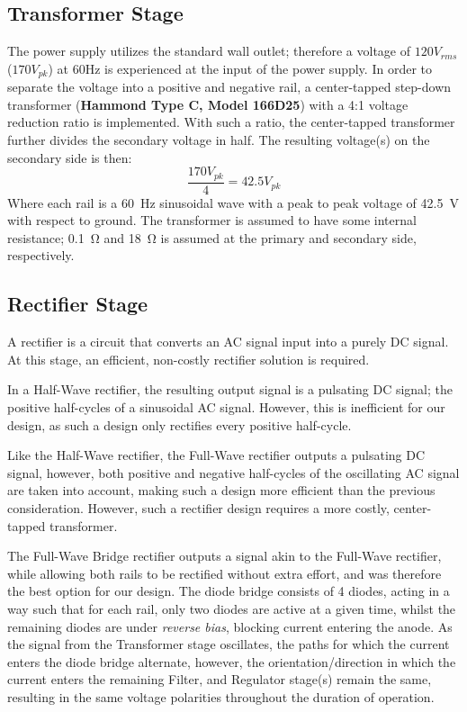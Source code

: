 \documentclass[12pt]{article}
\begin{document}
\subsection{Transformer Stage}
The power supply utilizes the standard wall outlet; therefore a voltage of $120V_{rms}$ ($170V_{pk}$) at 60Hz is experienced at the input of the power supply. In order to separate the voltage into a positive and negative rail, a center-tapped step-down transformer (\textbf{Hammond Type C, Model 166D25}) with a 4:1 voltage reduction ratio is implemented. With such a ratio, the center-tapped transformer further divides the secondary voltage in half. The resulting voltage(s) on the secondary side is then: 
\[ \frac{170V_{pk}}{4} = 42.5V_{pk}\]
Where each rail is a \SI{60}{\hertz} sinusoidal wave with a peak to peak voltage of \SI{42.5}{\volt} with respect to ground.
The transformer is assumed to have some internal resistance; \SI{0.1}{\ohm} and \SI{18}{\ohm} is assumed at the primary and secondary side, respectively.

\subsection{Rectifier Stage}
A rectifier is a circuit that converts an AC signal input into a purely DC signal. At this stage, an efficient, non-costly rectifier solution is required.

In a Half-Wave rectifier, the resulting output signal is a pulsating DC signal; the positive half-cycles of a sinusoidal AC signal. However, this is inefficient for our design, as such a design only rectifies every positive half-cycle.

Like the Half-Wave rectifier, the Full-Wave rectifier outputs a pulsating DC signal, however, both positive and negative half-cycles of the oscillating AC signal are taken into account, making such a design more efficient than the previous consideration. However, such a rectifier design requires a more costly, center-tapped transformer.

The Full-Wave Bridge rectifier outputs a signal akin to the Full-Wave rectifier, while allowing both rails to be rectified without extra effort, and was therefore the best option for our design. The diode bridge consists of 4 diodes, acting in a way such that for each rail, only two diodes are active at a given time, whilst the remaining diodes are under \textit{reverse bias}, blocking current entering the anode. As the signal from the Transformer stage oscillates, the paths for which the current enters the diode bridge alternate, however, the orientation/direction in which the current enters the remaining Filter, and Regulator stage(s) remain the same, resulting in the same voltage polarities throughout the duration of operation.
\end{document}
